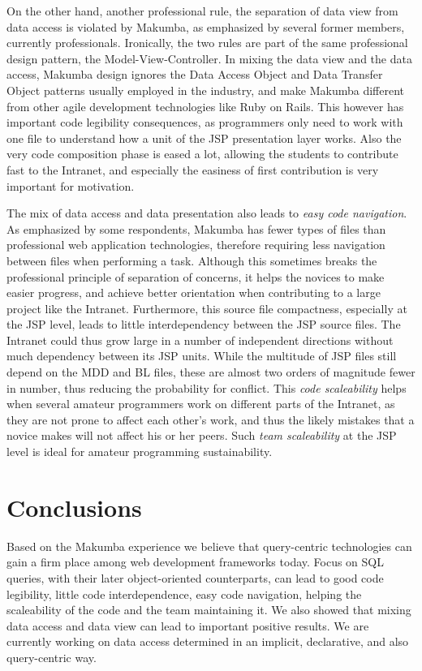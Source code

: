 \documentclass{llncs}
\begin{document}
On the other hand, another professional rule, the separation of data view from data access is violated by Makumba, as emphasized by several former members, currently professionals. Ironically, the two rules are part of the same professional design pattern, the Model-View-Controller. In mixing the data view and the data access, Makumba design ignores the Data Access Object and Data Transfer Object patterns usually employed in the industry, and make Makumba different from other agile development technologies like Ruby on Rails. This however has important code legibility consequences, as programmers only need to work with one file to understand how a unit of the JSP presentation layer works. Also the very code composition phase is eased a lot, allowing the students to contribute fast to the Intranet, and especially the easiness of first contribution is very important for motivation. 

The mix of data access and data presentation also leads to \textit{easy code navigation}.  As emphasized by some respondents, Makumba has fewer types of files than professional web application technologies, therefore requiring less navigation between files when performing a task. Although this sometimes breaks the professional principle of separation of concerns, it helps the novices to make easier progress, and achieve better orientation when contributing to a large project like the Intranet. Furthermore, this source file compactness, especially at the JSP level, leads to little interdependency between the JSP source files. The Intranet could thus grow large in a number of independent directions without much dependency between its JSP units. While the multitude of JSP files still depend on the MDD and BL files, these are almost two orders of magnitude fewer in number, thus reducing the probability for conflict. This \textit{code scaleability}  helps when several amateur programmers work on different parts of the Intranet, as they are not prone to affect each other's work, and thus the likely mistakes that a novice makes will not affect his or her peers. Such \textit{team scaleability} at the JSP level is ideal for amateur programming sustainability.

\section{Conclusions}\label{sec:conclusions}
Based on the Makumba experience we believe that query-centric technologies can gain a firm place among web development frameworks today. Focus on SQL queries, with their later object-oriented counterparts, can lead to good  code legibility, little code interdependence, easy code navigation,  helping the scaleability of the code and the team maintaining it.  We also showed that mixing data access and data view can lead to important positive results. We are currently working on data access determined in an implicit, declarative, and also query-centric way. 
\end{document}
